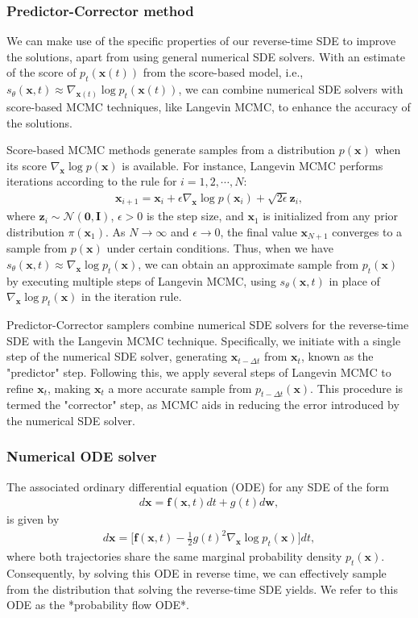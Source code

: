 \documentclass{article}
\begin{document}
\subsubsection{Predictor-Corrector method}
We can make use of the specific properties of our reverse-time SDE to improve the solutions, apart from using general numerical SDE solvers. With an estimate of the score of $p_t(\mathbf{x}(t))$ from the score-based model, i.e., $s_\theta(\mathbf{x}, t) \approx \nabla_{\mathbf{x}(t)} \log p_t(\mathbf{x}(t))$, we can combine numerical SDE solvers with score-based MCMC techniques, like Langevin MCMC, to enhance the accuracy of the solutions.

Score-based MCMC methods generate samples from a distribution $p(\mathbf{x})$ when its score $\nabla_\mathbf{x} \log p(\mathbf{x})$ is available. For instance, Langevin MCMC performs iterations according to the rule for $i=1,2,\cdots, N$:
\begin{align*}
\mathbf{x}_{i+1} = \mathbf{x}_{i} + \epsilon \nabla_\mathbf{x} \log p(\mathbf{x}_i) + \sqrt{2\epsilon} \mathbf{z}_i,
\end{align*}
where $\mathbf{z}_i \sim \mathcal{N}(\mathbf{0}, \mathbf{I})$, $\epsilon > 0$ is the step size, and $\mathbf{x}_1$ is initialized from any prior distribution $\pi(\mathbf{x}_1)$. As $N\to\infty$ and $\epsilon \to 0$, the final value $\mathbf{x}_{N+1}$ converges to a sample from $p(\mathbf{x})$ under certain conditions. Thus, when we have $s_\theta(\mathbf{x}, t) \approx \nabla_\mathbf{x} \log p_t(\mathbf{x})$, we can obtain an approximate sample from $p_t(\mathbf{x})$ by executing multiple steps of Langevin MCMC, using $s_\theta(\mathbf{x}, t)$ in place of $\nabla_\mathbf{x} \log p_t(\mathbf{x})$ in the iteration rule.

Predictor-Corrector samplers combine numerical SDE solvers for the reverse-time SDE with the Langevin MCMC technique. Specifically, we initiate with a single step of the numerical SDE solver, generating $\mathbf{x}_{t-\Delta t}$ from $\mathbf{x}_t$, known as the "predictor" step. Following this, we apply several steps of Langevin MCMC to refine $\mathbf{x}_t$, making $\mathbf{x}_t$ a more accurate sample from $p_{t-\Delta t}(\mathbf{x})$. This procedure is termed the "corrector" step, as MCMC aids in reducing the error introduced by the numerical SDE solver.
\subsubsection{Numerical ODE solver}
The associated ordinary differential equation (ODE) for any SDE of the form
\begin{align*}
d \mathbf{x} = \mathbf{f}(\mathbf{x}, t) d t + g(t) d \mathbf{w},
\end{align*}
is given by
\begin{align*}
d \mathbf{x} = \bigg[\mathbf{f}(\mathbf{x}, t) - \frac{1}{2}g(t)^2 \nabla_\mathbf{x} \log p_t(\mathbf{x})\bigg] dt,
\end{align*}
where both trajectories share the same marginal probability density $p_t(\mathbf{x})$. Consequently, by solving this ODE in reverse time, we can effectively sample from the distribution that solving the reverse-time SDE yields.
We refer to this ODE as the *probability flow ODE*.
\end{document}
